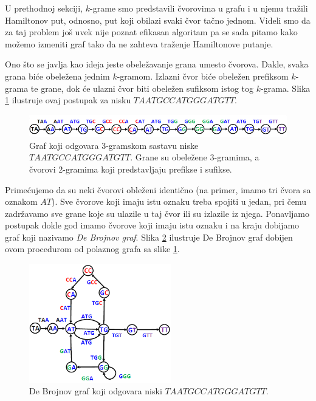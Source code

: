 U prethodnoj sekciji, $k$-grame smo predstavili čvorovima u grafu i u njemu tražili Hamiltonov put, odnosno, put koji obilazi svaki čvor tačno jednom. Videli smo da za taj problem još uvek nije poznat efikasan algoritam pa se sada pitamo kako možemo izmeniti graf tako da ne zahteva traženje Hamiltonove putanje.

Ono što se javlja kao ideja jeste obeležavanje grana umesto čvorova. Dakle, svaka grana biće obeležena jednim $k$-gramom. Izlazni čvor biće obeležen prefiksom $k$-grama te grane, dok će ulazni čvor biti obeležen sufiksom istog tog $k$-grama. Slika \ref{slika:ojler} ilustruje ovaj postupak za nisku $TAATGCCATGGGATGTT$.

\begin{figure}[h]
	\centering
	\includegraphics[width=1\textwidth]{poglavlja/3/slike/ojler.png}
	\caption{Graf koji odgovara 3-gramskom sastavu niske $TAATGCCATGGGATGTT$. Grane su obeležene 3-gramima, a čvorovi 2-gramima koji predstavljaju prefikse i sufikse.}
	\label{slika:ojler}
\end{figure} 

Primećujemo da su neki čvorovi obleženi identično (na primer, imamo tri čvora sa oznakom $AT$). Sve čvorove koji imaju istu oznaku treba spojiti u jedan, pri čemu zadržavamo sve grane koje su ulazile u taj čvor ili su izlazile iz njega. Ponavljamo postupak dokle god imamo čvorove koji imaju istu oznaku i na kraju dobijamo graf koji nazivamo \emph{De Brojnov graf}. Slika \ref{slika:debrojnov} ilustruje De Brojnov graf dobijen ovom procedurom od polaznog grafa sa slike \ref{slika:ojler}. 

\begin{figure}[h]
	\centering
	\includegraphics[width=0.55\textwidth]{poglavlja/3/slike/debrojnov.png}
	\caption{De Brojnov graf koji odgovara niski $TAATGCCATGGGATGTT$.}
	\label{slika:debrojnov}
\end{figure} 

